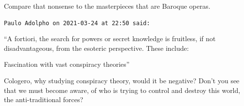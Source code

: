 \begin{footnotesize}
\begin{sffamily}
Compare that nonsense to the masterpieces that are Baroque operas.


\hfill

\texttt{Paulo Adolpho on 2021-03-24 at 22:50 said: }

“A fortiori, the search for powers or secret knowledge is fruitless, if not disadvantageous, from the esoteric perspective. These include:

Fascination with vast conspiracy theories”

Cologero, why studying conspiracy theory, would it be negative? Don't you see that we must become aware, of who is trying to control and destroy this world, the anti-traditional forces?


\end{sffamily}\end{footnotesize}
